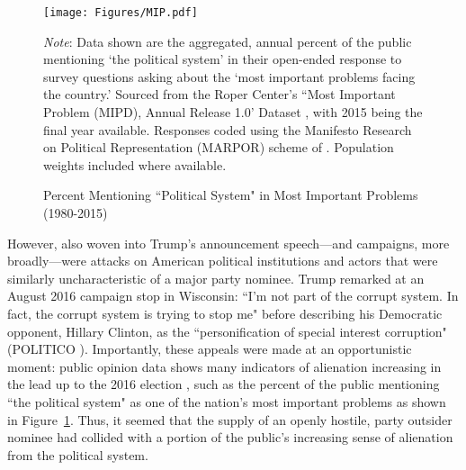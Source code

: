 \documentclass[12pt]{article}
\begin{document}
\begin{figure}[!t]
	\centering
	\texttt{[image: Figures/MIP.pdf]}
	\caption{Percent Mentioning ``Political System" in Most Important Problems (1980-2015)}\label{fig:mip}
	\vspace{-1em}
	{\scriptsize \textit{Note}: Data shown are the aggregated, annual percent of the public mentioning `the political system' in their open-ended response to survey questions asking about the `most important problems facing the country.' Sourced from the Roper Center's ``Most Important Problem (MIPD), Annual Release 1.0' Dataset \parencite[see also][]{heffington2019most}, with 2015 being the final year available. Responses coded using the Manifesto Research on Political Representation (MARPOR) scheme of \textcite{volkens2013mapping}. Population weights included where available.\par}
\end{figure}

However, also woven into Trump's announcement speech---and campaigns, more broadly---were attacks on American political institutions and actors that were similarly uncharacteristic of a major party nominee. Trump remarked at an August 2016 campaign stop in Wisconsin: ``I'm not part of the corrupt system. In fact, the corrupt system is trying to stop me" before describing his Democratic opponent, Hillary Clinton, as the ``personification of special interest corruption" (POLITICO \citeyear{politico2016trump}). Importantly, these appeals were made at an opportunistic moment: public opinion data shows many indicators of alienation increasing in the lead up to the 2016 election \parencite{citrin2018political}, such as the percent of the public mentioning ``the political system" as one of the nation's most important problems as shown in Figure~\ref{fig:mip}. Thus, it seemed that the supply of an openly hostile, party outsider nominee had collided with a portion of the public's increasing sense of alienation from the political system. 
\end{document}
